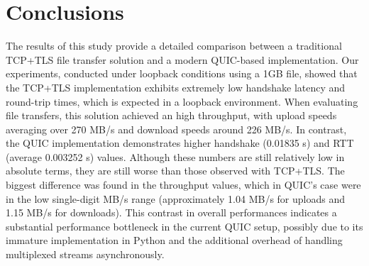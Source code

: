 \section{Conclusions}
The results of this study provide a detailed comparison between a traditional TCP+TLS file transfer solution and a modern QUIC-based implementation. Our experiments, conducted under loopback conditions using a 1GB file, showed that the TCP+TLS implementation exhibits extremely low handshake latency and round-trip times, which is expected in a loopback environment. When evaluating file transfers, this solution achieved an high throughput, with upload speeds averaging over 270 MB/s and download speeds around 226 MB/s. In contrast, the QUIC implementation demonstrates higher handshake (0.01835 s) and RTT (average 0.003252 s) values. Although these numbers are still relatively low in absolute terms, they are still worse than those observed with TCP+TLS. The biggest difference was found in the throughput values, which in QUIC's case were in the low single-digit MB/s range (approximately 1.04 MB/s for uploads and 1.15 MB/s for downloads). This contrast in overall performances indicates a substantial performance bottleneck in the current QUIC setup, possibly due to its immature implementation in Python and the additional overhead of handling multiplexed streams asynchronously.